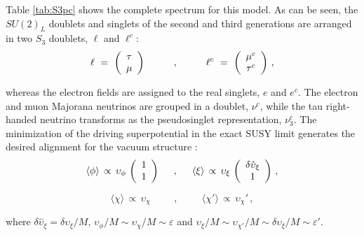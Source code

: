 \documentclass[a4paper,11pt]{article}
\newcommand{\beq}{\begin{equation}}
\newcommand{\eeq}{\end{equation}}
\newcommand{\vep}{\varepsilon}
\newcommand{\nn}{\nonumber}
\begin{document}
Table \ref{tab:S3pc} shows the complete spectrum for this model. As can be seen, the $SU(2)_L$ doublets and singlets of the second and third generations are arranged in two $S_3$ doublets, $\ell$ and $\ell^c$:
\beq
  \ell~=~\left(\begin{array}{c}
                \tau \\
                \mu \end{array}\right) \hspace{1.cm},\hspace{1.cm}
  \ell^c~=~\left(\begin{array}{c}
               \mu^c \\
              \tau^c \end{array}\right) \,,
\eeq

whereas the electron fields are assigned to the real singlets, $e$ and $e^c$. The electron and muon Majorana neutrinos are grouped in a doublet, $\nu^c$, while the tau right-handed neutrino transforms as the pseudosinglet representation, $\nu_3^c$. The minimization of the driving superpotential in the exact SUSY limit generates the desired alignment for the vacuum structure \cite{Meloni:2012ci}:
\beq \label{eqn:S3vac1}
  \langle\phi\rangle \,\propto\, \upsilon_\phi\, \left(\begin{array}{c} 1 \\ 1 \end{array} 
  \right) \hspace{0.5cm},\hspace{0.5cm}\langle\xi\rangle \,\propto\, \upsilon_\xi\, \left(\begin{array}{c} 
  \delta \hat{\upsilon}_\xi \\ 1 \end{array} \right)\,,\nn
  \eeq

\beq \label{eqn:S3vac2}
\langle\chi\rangle \,\propto\, \upsilon_\chi \hspace{1cm},\hspace{1cm}
  \langle\chi'\rangle \,\propto\, \upsilon_\chi'\, ,
\eeq

where $\delta \hat \upsilon_{\xi}= \delta \upsilon_{\xi}/M$, $\upsilon_\phi/M\sim \upsilon_\chi/M\sim\vep$ and $\upsilon_\xi/M\sim \upsilon_{\chi'}/M\sim \delta \upsilon_{\xi}/M\sim \vep'$. 
\end{document}
